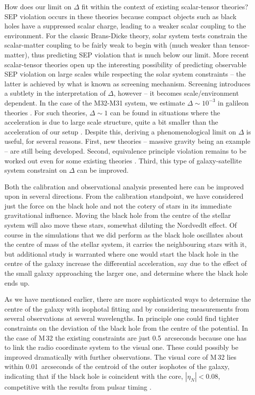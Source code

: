 \documentclass[useAMS,usenatbib]{mn2e}
\begin{document}
How does our limit on $\Delta$ fit within the context of existing
scalar-tensor theories? SEP violation occurs in these theories because
compact objects such as black holes have a suppressed scalar charge,
leading to a weaker scalar coupling to the environment. For the
classic Brans-Dicke theory, solar system tests constrain the
scalar-matter coupling to be fairly weak to begin with (much weaker
than tensor-matter), thus predicting SEP violation that is much below
our limit.  More recent scalar-tensor theories open up the interesting
possibility of predicting observable SEP violation on large scales
while respecting the solar system constraints -- the latter is
achieved by what is known as screening mechanism. Screening introduces
a subtlety in the interpretation of $\Delta$, however -- it becomes
scale/environment dependent. In the case of the M32-M31 system, we
estimate $\Delta \sim 10^{-3}$ in galileon theories
\citep{2009PhRvD..79f4036N}.  For such theories, $\Delta \sim 1$ can
be found in situations where the acceleration is due to large scale
structure, quite a bit smaller than the acceleration of our setup
\citep{2012PhRvL.109e1304H}.  Despite this, deriving a
phenomenological limit on $\Delta$ is useful, for several reasons.
First, new theories -- massive gravity being an example -- are still
being developed. Second, equivalence principle violation remains to be
worked out even for some existing theories
\citep{2009PhRvD..80j4002H}.  Third, this type of galaxy-satellite
system constraint on $\Delta$ can be improved.

Both the calibration and observational analysis presented here can be
improved upon in several directions.  From the calibration standpoint,
we have 
considered
just the force on the black hole and not the cotery
of stars in its immediate gravitational influence.  Moving the black
hole from the centre of the stellar system will also move these stars,
somewhat 
diluting 
the Nordvedlt effect.  Of course in the simulations
that we did perform as the black hole oscillates about the centre of
mass of the stellar system, it carries the neighbouring stars with it,
but additional study is warranted where one would start the black hole
in the centre of the galaxy increase the differential acceleration,
say due to the effect of the small galaxy 
approaching 
the larger one,
and determine where the black hole ends up.

As we have mentioned earlier, there are more sophisticated ways to
determine the centre of the galaxy with isophotal fitting and by
considering measurements from several observations at several
wavelengths.  In 
principle 
one could find tighter constraints on the
deviation of the black hole from the centre of the potential.  In the
case of M\,32 the existing constraints are just 0.5~arcseconds because
one has to link the radio coordinate system to the visual one.  These
could possibly be improved dramatically with further observations.
The visual core of M\,32 lies within 0.01~arcseconds of the centroid
of the outer isophotes of the galaxy, indicating that if the black
hole is coincident with the core, $|\eta_N|<0.08$, competitive with the
results from pulsar timing \citep{Stairs:2005}.
\end{document}
